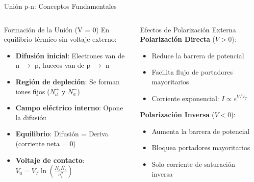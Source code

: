 \documentclass[
    10pt,
    aspectratio=169,
    xcolor={dvipsnames},
    spanish,
    ]{beamer}
\begin{document}
\begin{frame}{Unión p-n: Conceptos Fundamentales}
\begin{columns}
  \begin{column}{0.48\textwidth}
    \begin{block}{Formación de la Unión (V = 0)}
      \scriptsize
      En equilibrio térmico sin voltaje externo:
      \begin{itemize}
        \item \textbf{Difusión inicial}: Electrones van de n $\rightarrow$ p, huecos van de p $\rightarrow$ n
        \item \textbf{Región de depleción}: Se forman iones fijos ($N_d^+$ y $N_a^-$)
        \item \textbf{Campo eléctrico interno}: Opone la difusión
        \item \textbf{Equilibrio}: Difusión = Deriva (corriente neta = 0)
        \item \textbf{Voltaje de contacto}: $V_0 = V_T \ln\left(\frac{N_a N_d}{n_i^2}\right)$
      \end{itemize}
    \end{block}
  \end{column}
  
  \begin{column}{0.48\textwidth}
    \begin{block}{Efectos de Polarización Externa}
      \scriptsize
      \textbf{Polarización Directa} ($V > 0$):
      \begin{itemize}
        \item Reduce la barrera de potencial
        \item Facilita flujo de portadores mayoritarios
        \item Corriente exponencial: $I \propto e^{V/V_T}$
      \end{itemize}
      
      \vspace{0.2cm}
      \textbf{Polarización Inversa} ($V < 0$):
      \begin{itemize}
        \item Aumenta la barrera de potencial
        \item Bloquea portadores mayoritarios
        \item Solo corriente de saturación inversa
      \end{itemize}
    \end{block}
  \end{column}
\end{columns}


\end{frame}
\end{document}
